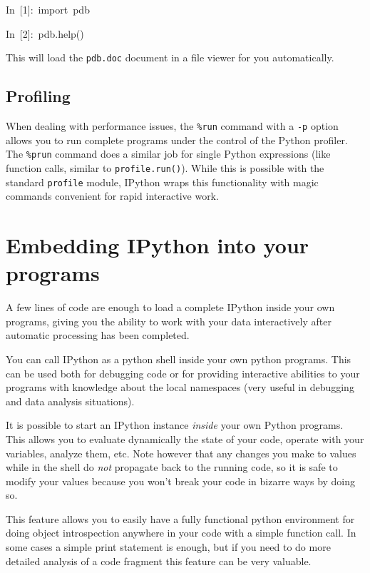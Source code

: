 \begin{lyxcode}
In~{[}1]:~import~pdb

In~{[}2]:~pdb.help()
\end{lyxcode}
This will load the \texttt{pdb.doc} document in a file viewer for
you automatically.


\subsection{Profiling}

When dealing with performance issues, the \texttt{\%run} command with
a \texttt{-p} option allows you to run complete programs under the
control of the Python profiler. The \texttt{\%prun} command does a
similar job for single Python expressions (like function calls, similar
to \texttt{profile.run()}). While this is possible with the standard
\texttt{profile} module, IPython wraps this functionality with magic
commands convenient for rapid interactive work.


\section[Embedding]{\label{sec:ipython_embed}Embedding IPython into your programs }

A few lines of code are enough to load a complete IPython inside your
own programs, giving you the ability to work with your data interactively
after automatic processing has been completed. 

You can call IPython as a python shell inside your own python programs.
This can be used both for debugging code or for providing interactive
abilities to your programs with knowledge about the local namespaces
(very useful in debugging and data analysis situations).

It is possible to start an IPython instance \emph{inside} your own
Python programs. This allows you to evaluate dynamically the state
of your code, operate with your variables, analyze them, etc. Note
however that any changes you make to values while in the shell do
\emph{not} propagate back to the running code, so it is safe to modify
your values because you won't break your code in bizarre ways by doing
so.

This feature allows you to easily have a fully functional python environment
for doing object introspection anywhere in your code with a simple
function call. In some cases a simple print statement is enough, but
if you need to do more detailed analysis of a code fragment this feature
can be very valuable.

